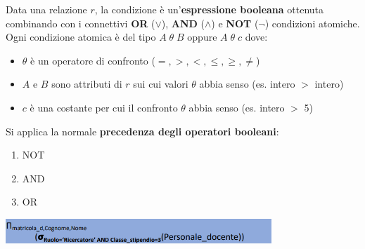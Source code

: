 \documentclass[12pt]{article}
\begin{document}
Data una relazione $r$, la condizione è un'\textbf{espressione booleana} ottenuta combinando con i connettivi \textbf{OR} ($\lor$), \textbf{AND} ($\land$) e \textbf{NOT} ($\neg$)
condizioni atomiche.
Ogni condizione atomica è del tipo $A \; \theta \; B$ oppure $A \; \theta \; c$ dove:
\begin{itemize}
    \item $\theta$ è un operatore di confronto ($=, >, <, \leq, \geq, \neq$)
    \item $A$ e $B$ sono attributi di $r$ sui cui valori $\theta$ abbia senso (es. intero $>$ intero)
    \item $c$ è una costante per cui il confronto $\theta$ abbia senso (es. intero $>$ 5)
\end{itemize}
Si applica la normale \textbf{precedenza degli operatori booleani}:
\begin{enumerate}
    \item NOT
    \item AND
    \item OR
\end{enumerate}
\begin{center}
    \includegraphics[width =0.75\textwidth]{Images/137.PNG}
\end{center}
\end{document}
